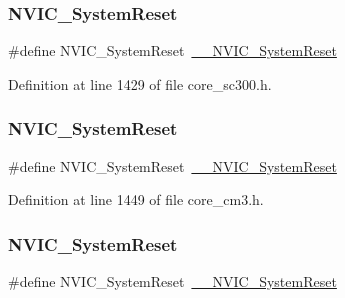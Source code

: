 \subsubsection{\texorpdfstring{N\+V\+I\+C\+\_\+\+System\+Reset}{NVIC\_SystemReset}\hspace{0.1cm}{\footnotesize\ttfamily [7/13]}}
{\footnotesize\ttfamily \#define N\+V\+I\+C\+\_\+\+System\+Reset~\hyperlink{group___c_m_s_i_s___core___n_v_i_c_functions_ga0d9aa2d30fa54b41eb780c16e35b676c}{\+\_\+\+\_\+\+N\+V\+I\+C\+\_\+\+System\+Reset}}



Definition at line 1429 of file core\+\_\+sc300.\+h.

\mbox{\label{group___c_m_s_i_s___core___n_v_i_c_functions_ga6aa0367d3642575610476bf0366f0c48}} 
\subsubsection{\texorpdfstring{N\+V\+I\+C\+\_\+\+System\+Reset}{NVIC\_SystemReset}\hspace{0.1cm}{\footnotesize\ttfamily [8/13]}}
{\footnotesize\ttfamily \#define N\+V\+I\+C\+\_\+\+System\+Reset~\hyperlink{group___c_m_s_i_s___core___n_v_i_c_functions_ga0d9aa2d30fa54b41eb780c16e35b676c}{\+\_\+\+\_\+\+N\+V\+I\+C\+\_\+\+System\+Reset}}



Definition at line 1449 of file core\+\_\+cm3.\+h.

\mbox{\label{group___c_m_s_i_s___core___n_v_i_c_functions_ga6aa0367d3642575610476bf0366f0c48}} 
\subsubsection{\texorpdfstring{N\+V\+I\+C\+\_\+\+System\+Reset}{NVIC\_SystemReset}\hspace{0.1cm}{\footnotesize\ttfamily [9/13]}}
{\footnotesize\ttfamily \#define N\+V\+I\+C\+\_\+\+System\+Reset~\hyperlink{group___c_m_s_i_s___core___n_v_i_c_functions_ga0d9aa2d30fa54b41eb780c16e35b676c}{\+\_\+\+\_\+\+N\+V\+I\+C\+\_\+\+System\+Reset}}



